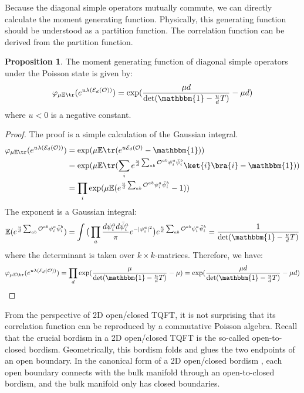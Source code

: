 \documentclass[a4paper,11pt]{article}
\theoremstyle{definition}
\numberwithin{equation}{section}
\newtheorem{proposition}{Proposition}[section]
\begin{document}
Because the diagonal simple operators mutually commute, we can directly calculate the moment generating function. Physically, this generating function should be understood as a partition function. The correlation function can be derived from the partition function.
\begin{proposition}
    The moment generating function of diagonal simple operators under the Poisson state is given by:
    \begin{equation}
        \varphi_{\mu\mathbb{E}\tr}(e^{u\lambda(\mathcal{E}_d(\mathcal{O}))}) =  \exp(\frac{\mu d}{\det(\mathbbm{1} - \frac{u}{d}T)} - \mu d)
    \end{equation}
    where $u < 0$ is a negative constant. 
\end{proposition}
\begin{proof}
    The proof is a simple calculation of the Gaussian integral.
    \begin{align}
        \begin{split}
            \varphi_{\mu\mathbb{E}\tr}(e^{u\lambda(\mathcal{E}_d(\mathcal{O}))}) &= \exp(\mu\mathbb{E}\tr(e^{u\mathcal{E}_d(\mathcal{O})} - \mathbbm{1}))
            \\
            &=\exp(\mu\mathbb{E}\tr(\sum_ie^{\frac{u}{d}\sum_{ab}\mathcal{O}^{ab}\psi^a_i\bar{\psi}^b_i}\ket{i}\bra{i} - \mathbbm{1}))
            \\
            &=\prod_i\exp(\mu\mathbb{E}(e^{\frac{u}{d}\sum_{ab}\mathcal{O}^{ab}\psi^a_i\bar{\psi}^b_i} - 1))
        \end{split}
    \end{align}
    The exponent is a Gaussian integral:
    \begin{equation}
        \mathbb{E}(e^{\frac{u}{d}\sum_{ab}\mathcal{O}^{ab}\psi^a_i\bar{\psi}^b_i}) = \int\big(\prod_{a}\frac{d\psi^a_id\bar{\psi}^a_i}{\pi}e^{-|\psi^a_i|^2}\big)e^{\frac{u}{d}\sum_{ab}\mathcal{O}^{ab}\psi^a_i\bar{\psi}^b_i} = \frac{1}{\det(\mathbbm{1} - \frac{u}{d}T)}
    \end{equation}
    where the determinant is taken over $k\times k$-matrices. Therefore, we have:
    \begin{equation}
        \varphi_{\mu\mathbb{E}\tr}(e^{u\lambda(\mathcal{E}_d(\mathcal{O}))}) = \prod_d\exp(\frac{\mu}{\det(\mathbbm{1} - \frac{u}{d}T)} - \mu) = \exp(\frac{\mu d}{\det(\mathbbm{1} - \frac{u}{d}T)} - \mu d)\qedhere
    \end{equation}
\end{proof}
From the perspective of 2D open/closed TQFT, it is not surprising that its correlation function can be reproduced by a commutative Poisson algebra. Recall that the crucial bordism in a 2D open/closed TQFT is the so-called open-to-closed bordism. Geometrically, this bordism folds and glues the two endpoints of an open boundary. In the canonical form of a 2D open/closed bordism \cite{Lauda-Pfeiffer}, each open boundary connects with the bulk manifold through an open-to-closed bordism, and the bulk manifold only has closed boundaries. 
\end{document}
